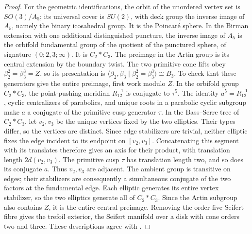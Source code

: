 \begin{proof}
For the geometric identifications, the orbit of the unordered vertex
set is \(SO(3)/A_5\); its universal cover is \(SU(2)\), with deck
group the inverse image of \(A_5\), namely the binary icosahedral
group. It is the Poincar\'e sphere. In the Birman extension with one
additional distinguished puncture, the inverse image of \(A_5\)
is the orbifold fundamental group of the quotient of the punctured
sphere, of signature \((0;2,3;\infty)\). It is \(C_2*C_3\).
The preimage in the Artin group is its central extension by the
boundary twist. The two primitive cone lifts obey
\(\beta_2^2=\beta_3^3=Z\), so its presentation is
\(\langle\beta_2,\beta_3\mid\beta_2^2=\beta_3^3\rangle\cong B_3\).
To check that these generators give the entire preimage, first
work modulo \(Z\). In the orbifold group \(C_2*C_3\), the
point-pushing meridian \(R_{12}^{-1}\) is conjugate to \(\tau^5\).
The identity \(a^5=R_{12}^{-1}\), cyclic centralizers of
parabolics, and unique roots in a parabolic cyclic subgroup make
\(a\) a conjugate of the primitive cusp generator \(\tau\).
In the Bass--Serre tree of \(C_2*C_3\), let \(v_2,v_3\) be
the unique vertices fixed by the two elliptics. Their types differ,
so the vertices are distinct. Since edge stabilizers are trivial,
neither elliptic fixes the edge incident to its endpoint on
\([v_2,v_3]\). Concatenating this segment with its translates
therefore gives an axis for their product, with translation
length \(2d(v_2,v_3)\). The primitive cusp \(\tau\) has
translation length two, and so does its conjugate \(a\).
Thus \(v_2,v_3\) are adjacent. The ambient group is transitive
on edges; their stabilizers are consequently a simultaneous
conjugate of the two factors at the fundamental edge.
Each elliptic generates its entire vertex stabilizer, so the
two elliptics generate all of \(C_2*C_3\).
Since the Artin subgroup also contains \(Z\), it is the entire
central preimage. Removing the order-five
Seifert fibre gives the trefoil exterior, the Seifert manifold over
a disk with cone orders two and three. These descriptions agree
with \citet[Descriptions 6--8]{KirbyScharlemann1979}.
\end{proof}

